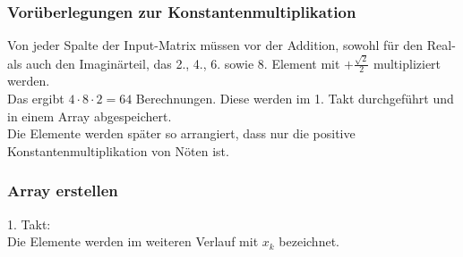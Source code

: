 \begin{frame}\frametitle{Vorüberlegungen zur Konstantenmultiplikation}
 Von jeder Spalte der Input-Matrix müssen vor der Addition, sowohl für den Real- als auch den Imaginärteil, das 2., 4., 6. sowie 8. Element mit $+\frac{\sqrt{2}}{2}$ multipliziert werden.\\
 
 Das ergibt $4 \cdot 8 \cdot 2 = 64$ Berechnungen. Diese werden im 1. Takt durchgeführt und in einem Array abgespeichert.\\
 
 Die Elemente werden später so arrangiert, dass nur die positive Konstantenmultiplikation von Nöten ist.
\end{frame}



\begin{frame}\frametitle{Array erstellen}
1. Takt: \\


Die Elemente werden im weiteren Verlauf mit $x_k$ bezeichnet.
\end{frame}




